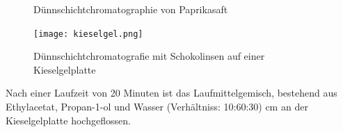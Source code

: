 \documentclass[11pt]{scrreprt}
\begin{document}
\begin{figure}[ht!]
\centering
{}
	\caption{Dünnschichtchromatographie von Paprikasaft}
	\label{img:paprika}
\end{figure}



\begin{figure}[ht!]
	\centering
	\texttt{[image: kieselgel.png]}
	\caption{Dünnschichtchromatografie mit Schokolinsen auf einer Kieselgelplatte}
	\label{img: Kieselgel}
\end{figure}

Nach einer Laufzeit von 20 Minuten ist das Laufmittelgemisch, bestehend aus Ethylacetat, Propan-1-ol und Wasser (Verhältniss: 10:60:30) cm an der Kieselgelplatte hochgeflossen.
\end{document}
